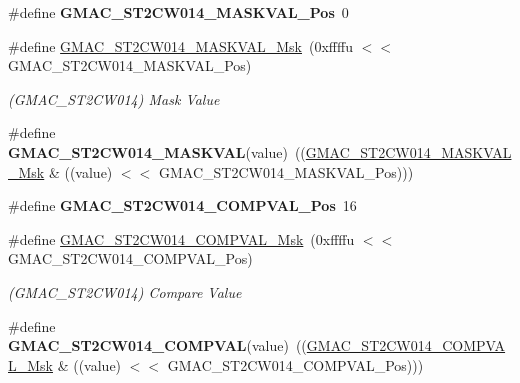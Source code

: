 \begin{DoxyCompactItemize}
\#define {\bfseries G\+M\+A\+C\+\_\+\+S\+T2\+C\+W014\+\_\+\+M\+A\+S\+K\+V\+A\+L\+\_\+\+Pos}~0
\item 
\mbox{\label{group__SAME70__GMAC_ga1c6899b604dac9156840df20fea497a7}} 
\#define \mbox{\hyperlink{group__SAME70__GMAC_ga1c6899b604dac9156840df20fea497a7}{G\+M\+A\+C\+\_\+\+S\+T2\+C\+W014\+\_\+\+M\+A\+S\+K\+V\+A\+L\+\_\+\+Msk}}~(0xffffu $<$$<$ G\+M\+A\+C\+\_\+\+S\+T2\+C\+W014\+\_\+\+M\+A\+S\+K\+V\+A\+L\+\_\+\+Pos)
\begin{DoxyCompactList}\small\item\em (G\+M\+A\+C\+\_\+\+S\+T2\+C\+W014) Mask Value \end{DoxyCompactList}\item 
\mbox{\label{group__SAME70__GMAC_ga4fa1c66a919b85c93d2811136f0c4474}} 
\#define {\bfseries G\+M\+A\+C\+\_\+\+S\+T2\+C\+W014\+\_\+\+M\+A\+S\+K\+V\+AL}(value)~((\mbox{\hyperlink{group__SAMV71__GMAC_ga1c6899b604dac9156840df20fea497a7}{G\+M\+A\+C\+\_\+\+S\+T2\+C\+W014\+\_\+\+M\+A\+S\+K\+V\+A\+L\+\_\+\+Msk}} \& ((value) $<$$<$ G\+M\+A\+C\+\_\+\+S\+T2\+C\+W014\+\_\+\+M\+A\+S\+K\+V\+A\+L\+\_\+\+Pos)))
\item 
\mbox{\label{group__SAME70__GMAC_ga236259e6c94eef841c4d7989124b410f}} 
\#define {\bfseries G\+M\+A\+C\+\_\+\+S\+T2\+C\+W014\+\_\+\+C\+O\+M\+P\+V\+A\+L\+\_\+\+Pos}~16
\item 
\mbox{\label{group__SAME70__GMAC_ga913a5a1ffeb8b4a75b5839e6b593b79c}} 
\#define \mbox{\hyperlink{group__SAME70__GMAC_ga913a5a1ffeb8b4a75b5839e6b593b79c}{G\+M\+A\+C\+\_\+\+S\+T2\+C\+W014\+\_\+\+C\+O\+M\+P\+V\+A\+L\+\_\+\+Msk}}~(0xffffu $<$$<$ G\+M\+A\+C\+\_\+\+S\+T2\+C\+W014\+\_\+\+C\+O\+M\+P\+V\+A\+L\+\_\+\+Pos)
\begin{DoxyCompactList}\small\item\em (G\+M\+A\+C\+\_\+\+S\+T2\+C\+W014) Compare Value \end{DoxyCompactList}\item 
\mbox{\label{group__SAME70__GMAC_ga8869d86006cf1463d8b89a93e33cb5ad}} 
\#define {\bfseries G\+M\+A\+C\+\_\+\+S\+T2\+C\+W014\+\_\+\+C\+O\+M\+P\+V\+AL}(value)~((\mbox{\hyperlink{group__SAMV71__GMAC_ga913a5a1ffeb8b4a75b5839e6b593b79c}{G\+M\+A\+C\+\_\+\+S\+T2\+C\+W014\+\_\+\+C\+O\+M\+P\+V\+A\+L\+\_\+\+Msk}} \& ((value) $<$$<$ G\+M\+A\+C\+\_\+\+S\+T2\+C\+W014\+\_\+\+C\+O\+M\+P\+V\+A\+L\+\_\+\+Pos)))

\end{DoxyCompactItemize}
